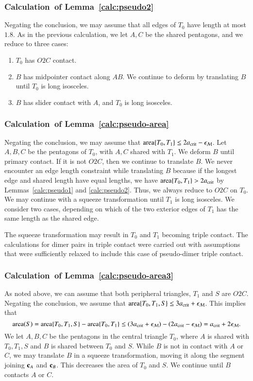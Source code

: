\subsubsection{Calculation~of Lemma~\ref{calc:pseudo2}} 
Negating the conclusion, we may assume that all edges of $T_0$ have
length at most $1.8$.  As in the previous calculation, we let $A,C$ be
the shared pentagons, and we reduce to three cases:
\begin{enumerate}
\item $T_0$ has $O2C$ contact.
\item $B$ has midpointer contact along $AB$.  We continue to deform by
  translating $B$ until $T_0$ is long isosceles.
\item $B$ has slider contact with $A$, and $T_0$ is long isosceles.
\end{enumerate}

\subsubsection{Calculation~of Lemma~\ref{calc:pseudo-area}} 
Negating the conclusion, we may assume that ${\operatorname{area}}\{T_0,T_1\}\le
2a_\text{crit} - \epsilon_{\mathcal M}$.  Let $A,B,C$ be the pentagons of $T_0$, with $A,C$
shared with $T_1$.  We deform $B$ until primary contact.  If it is not
$O2C$, then we continue to translate $B$.  We never encounter an edge
length constraint while translating $B$ because if the longest edge and
shared length have equal lengths, we have ${\operatorname{area}}\{T_0,T_1\} > 2a_\text{crit}$
by Lemmas~\ref{calc:pseudo1} and \ref{calc:pseudo2}.  Thus, we always
reduce to $O2C$ on $T_0$.  We may continue with a squeeze
transformation until $T_1$ is long isosceles.  We consider two cases,
depending on which of the two exterior edges of $T_1$ has the same
length as the shared edge.

The squeeze transformation may result in $T_0$ and $T_1$ becoming
triple contact.  The calculations for dimer pairs in triple contact
were carried out with assumptions that were sufficiently relaxed to
include this case of pseudo-dimer triple contact.

\subsubsection{Calculation~of Lemma~\ref{calc:pseudo-area3}}
As noted above, we can assume that both peripheral triangles, $T_1$
and $S$ are $O2C$.  Negating the conclusion, we assume that
${\operatorname{area}}\{T_0,T_1,S\}\le 3a_\text{crit}+\epsilon_{\mathcal M}$.  This implies that
\[
{\operatorname{area}}(S) = {\operatorname{area}}\{T_0,T_1,S\} - {\operatorname{area}}\{T_0,T_1\} 
\le (3a_\text{crit}+\epsilon_{\mathcal M}) - (2a_\text{crit} - \epsilon_{\mathcal M}) = a_\text{crit} + 2\epsilon_{\mathcal M}.
\]
We let $A,B,C$ be the pentagons in the central triangle $T_0$, where
$A$ is shared with $T_0,T_1,S$ and $B$ is shared between $T_0$ and
$S$.  While $B$ is not in contact with $A$ or $C$, we may translate
$B$ in a squeeze transformation, moving it along the segment joining
${\mathbf c}_A$ and ${\mathbf c}_B$.  This decreases the area of $T_0$ and $S$.  We
continue until $B$ contacts $A$ or $C$.

